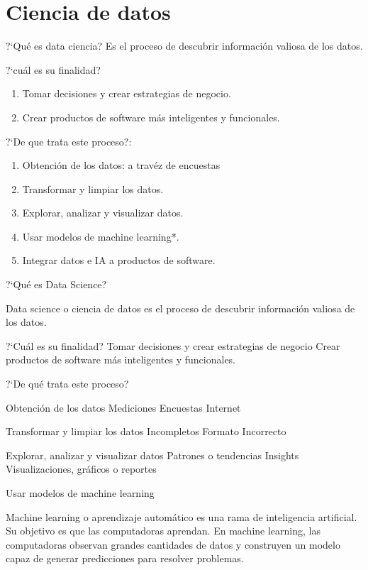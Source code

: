 

\part{Ciencia de datos}


?`Qu\'e es data ciencia?
Es el proceso de descubrir informaci\'on valiosa de los datos.

?`cu\'al es su finalidad?

\begin{enumerate}
	\item Tomar decisiones y crear estrategias de negocio.
	\item Crear productos de software m\'as inteligentes y funcionales.
\end{enumerate}

?`De que trata este proceso?:
\begin{enumerate}
	\item Obtenci\'on de los datos: a trav\'ez de encuestas
	\item Transformar y limpiar los datos.
	\item Explorar, analizar y visualizar datos.
	\item Usar modelos de machine learning*.
	\item Integrar datos e IA a productos de software.
\end{enumerate}




?`Qu\'e es Data Science?

Data science o ciencia de datos es el proceso de descubrir informaci\'on valiosa de los datos.

?`Cu\'al es su finalidad?
Tomar decisiones y crear estrategias de negocio
Crear productos de software m\'as inteligentes y funcionales.

?`De qu\'e trata este proceso?

Obtenci\'on de los datos
Mediciones
Encuestas
Internet

Transformar y limpiar los datos
Incompletos
Formato Incorrecto

Explorar, analizar y visualizar datos
Patrones o tendencias
Insights
Visualizaciones, gr\'aficos o reportes

Usar modelos de machine learning

Machine learning o aprendizaje autom\'atico es una rama de inteligencia artificial. Su objetivo es que las computadoras aprendan. En machine learning, las computadoras observan grandes cantidades de datos y construyen un modelo capaz de generar predicciones para resolver problemas.

